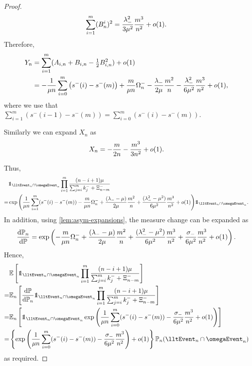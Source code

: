 \begin{proof}
\begin{equation*}
        \sum_{i=1}^m (B_n^i)^2 = \frac{\lambda_-^2}{3 \mu^2} \frac{m^3}{n^2} + o(1).
    \end{equation*}
    Therefore,
    \begin{align*}
        Y_n
        &= \sum_{i=1}^m (A_{i, n} + B_{i, n} - \tfrac{1}{2} B_{i, n}^2) + o(1) \\
        &= - \frac{1}{\mu n} \sum_{i=0}^m \left( s^-(i) - s^-(m) \right)
        + \frac{m}{\mu n} \Omega_n^-
        - \frac{\lambda_-}{2\mu} \frac{m^2}{n} - \frac{\lambda_-^2}{6 \mu^2} \frac{m^3}{n^2} + o(1),
    \end{align*}
    where we use that $\sum_{i=1}^m \left( s^-(i-1) - s^-(m) \right) = \sum_{i=0}^m \left( s^-(i) - s^-(m) \right)$.

    Similarly we can expand $X_n$ as
    \begin{equation*}
        X_n = - \frac{m}{2 n} - \frac{m^3}{3 n^2} + o(1).
    \end{equation*}

    Thus,
    \begin{align*}
        &\one_{\lltEvent_n \cap \omegaEvent_n} \prod_{i=1}^m \frac{(n-i+1)\mu}{\sum_{j=i}^m k_j^- + \Xi^-_{n-m}} \\
        = &\exp \Bigg( \frac{1}{\mu n} \sum_{i=1}^m (s^-(i) - s^-(m)) \nonumber
         - \frac{m}{\mu n} \Omega^-_n + \frac{(\lambda_- - \mu)}{2 \mu} \frac{m^2}{n} + \frac{(\lambda_-^2 - \mu^2)}{6 \mu^2} \frac{m^3}{n^2} + \littleo(1) \Bigg) \one_{\lltEvent_n \cap \omegaEvent_n}.
    \end{align*}
    In addition, using \cref{lem:asym-expansions}, the measure change can be expanded as
    \begin{equation*}
        \frac{\mathrm{d}{\mathbb P}_n}{\mathrm{d}{\mathbb P}} = \exp \left( 
            - \frac{m}{\mu n} \Omega_n^- + \frac{(\lambda_- - \mu)}{2\mu} \frac{m^2}{n}
            + \frac{(\lambda_-^2 - \mu^2)}{6 \mu^2} \frac{m^3}{n^2} + \frac{\sigma_-}{6 \mu^2} \frac{m^3}{n^2} + o(1)
        \right).
    \end{equation*}
    Hence,
    \begin{align*}
        &\E\left[ 
            \one_{\lltEvent_n \cap \omegaEvent_n}
            \prod_{i=1}^m \frac{(n-i+1)\mu}{\sum_{j=i}^m k^-_j + \Xi^-_{n-m}}
        \right] \\
        =& \E_n\left[ 
            \frac{\dif \P}{\dif \P_n}
            \one_{\lltEvent_n \cap \omegaEvent_n}
            \prod_{i=1}^m \frac{(n-i+1)\mu}{\sum_{j=i}^m k^-_j + \Xi^-_{n-m}}
        \right] \\
        =& \E_n \left[ 
            \one_{\lltEvent_n \cap \omegaEvent_n}
            \exp \left( 
                \frac{1}{\mu n} \sum_{i=0}^m (s^-(i) - s^-(m)) - \frac{\sigma_-}{6 \mu^2} \frac{m^3}{n^2} + \littleo(1)
            \right)
        \right] \\
        =& \left\{  
            \exp \left( 
                \frac{1}{\mu n} \sum_{i=0}^m (s^-(i) - s^-(m)) - \frac{\sigma_-}{6 \mu^2} \frac{m^3}{n^2}
            \right) + \littleo(1)
         \right\} \P_n(\lltEvent_n \cap \omegaEvent_n)
    \end{align*}
    as required.
\end{proof}

